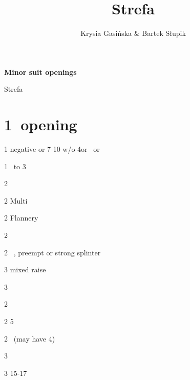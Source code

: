 \documentclass[12pt, a4paper]{report}
\title{\spades\clubs Strefa \xdiams\xhearts}
\author{Krysia Gasińska \& Bartek Słupik}
\makeatletter
\renewcommand{\maketitle}{%
  \begin{center}
    {\LARGE \bfseries Minor suit openings \par}
    \vspace{0.5cm}
    {\Large \spades\clubs Strefa \xdiams\xhearts \par}
    \vspace{0.5cm}
    {\Large \@author \par}
    \vspace{2cm}
  \end{center}
}
\makeatother
\begin{document}
\maketitle

        \section*{\colorbox{blue!30}{1\clubs\ opening}}
         {
            \begin{thoptions}
                \item[1\diams] negative or 7-10 w/o 4\major or \minor\ or \gf\ \diams
                \item[1\nt] \inv\ to 3\nt
                \item[2\clubs] \gf\ \bal
                \item[2\diams] Multi
                \item[2\hearts] Flannery
                \item[2\spades] \then\ \nt
                \item[2\nt] \then\ \clubs, preempt or strong splinter
                \item[3\clubs] mixed raise
                \item[3\diams] \inv\nat
            \end{thoptions}

            \begin{thoptions}
                \item[2\diams] \qqq
                \item[2\major] 5\major
                \item[2\nt] \bal\ (may have 4\major)
                \item[3\clubs] \clubs
                \item[3\nt] 15-17 \bal
            \end{thoptions}
        }
\end{document}
